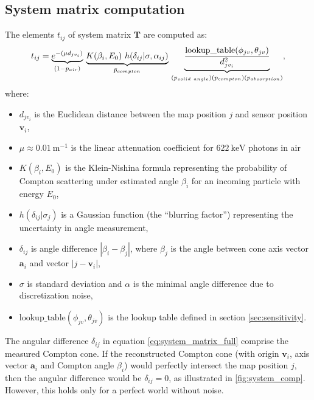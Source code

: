 \subsection{System matrix computation}
The elements $t_{ij}$ of system matrix $\mathbf{T}$ are computed as:
\begin{equation}
  t_{ij} = \underset{(1-p_{air})}{\underbrace{e^{-(\mu d_{jv_{i}})}}}\ 
  \underset{\bar{p}_{compton}} {  \underbrace{K(\beta_{i}, E_{0})\ h(\delta_{ij}|\sigma, \alpha_{ij})}} \
  \underset{(p_{solid\ angle})\\(p_{compton})\\(p_{absorption})} {\underbrace{\frac{\mathrm{lookup\_table}(\phi_{jv}, \theta_{jv})}{d_{jv_{i}}^{2}}}}
  ,%
  \label{eq:system_matrix_full}
\end{equation}
where:
\begin{itemize}
 \item $d_{jv_{i}}$ is the Euclidean distance between the map position $j$ and sensor position $\mathbf{v}_{i}$, 
\item $\mu \approx \SI{0.01}{\meter^{-1}} $ is the linear attenuation coefficient for $\SI{622}{\kilo\electronvolt}$ photons in air\item $K(\beta_{i}, E_{0})$ is the Klein-Nishina formula representing the probability of Compton scattering under estimated angle $\beta_{i}$ for an incoming particle with energy $E_{0}$,
\item $h(\delta_{ij}|\sigma_{j})$ is a Gaussian function (the ``blurring factor'') representing the uncertainty in angle measurement,
\item $\delta_{ij}$ is angle difference $|\beta_{i}-\beta_{j}|$, where $\beta_{j}$ is the angle between cone axis vector $\mathbf{a}_{i}$ and vector $|j-\mathbf{v}_{i}|$, 
\item $\sigma$ is standard deviation and $\alpha$ is the minimal angle difference due to discretization noise,
\item $\mathrm{lookup\_table}(\phi_{jv}, \theta_{jv})$ is the lookup table defined in section \autoref{sec:sensitivity}.
\end{itemize}

The angular difference $\delta_{ij}$ in equation \ref{eq:system_matrix_full} comprise the measured Compton cone.
If the reconstructed Compton cone (with origin $\mathbf{v}_{i}$, axis vector $\mathbf{a}_{i}$ and Compton angle $\beta_{i}$) would perfectly intersect the map position $j$, then the angular difference would be $\delta_{ij} = 0$, as illustrated in  \autoref{fig:system_comp}.
However, this holds only for a perfect world without noise.

